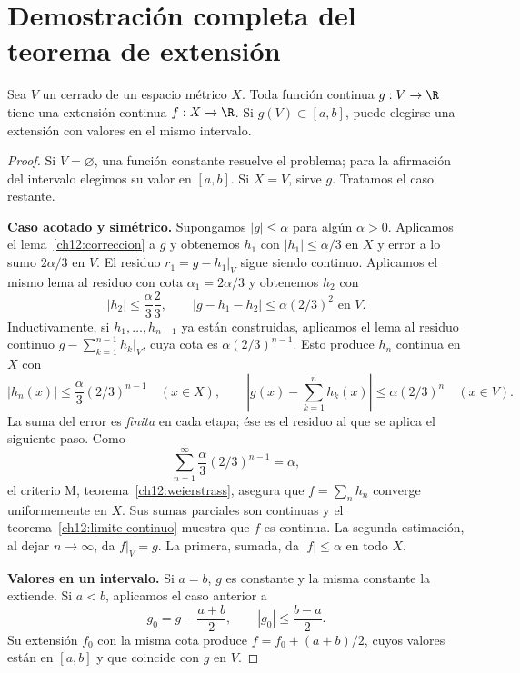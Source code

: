 \section{Demostración completa del teorema de extensión}
\begin{teorema}[Tietze]\label{ch12:tietze}
Sea $V$ un cerrado de un espacio métrico $X$. Toda función continua $g:V\to\R$ tiene una extensión continua $f:X\to\R$. Si $g(V)\subset[a,b]$, puede elegirse una extensión con valores en el mismo intervalo.
\end{teorema}
\begin{proof}
Si $V=\varnothing$, una función constante resuelve el problema; para la afirmación del intervalo elegimos su valor en $[a,b]$. Si $X=V$, sirve $g$. Tratamos el caso restante.

\textbf{Caso acotado y simétrico.} Supongamos $|g|\leq\alpha$ para algún $\alpha>0$. Aplicamos el lema~\ref{ch12:correccion} a $g$ y obtenemos $h_1$ con $|h_1|\leq\alpha/3$ en $X$ y error a lo sumo $2\alpha/3$ en $V$. El residuo $r_1=g-h_1|_V$ sigue siendo continuo. Aplicamos el mismo lema al residuo con cota $\alpha_1=2\alpha/3$ y obtenemos $h_2$ con
\[
 |h_2|\leq\frac\alpha3\frac23,
 \qquad |g-h_1-h_2|\leq\alpha(2/3)^2\text{ en }V.
\]
Inductivamente, si $h_1,\ldots,h_{n-1}$ ya están construidas, aplicamos el lema al residuo continuo $g-\sum_{k=1}^{n-1}h_k|_V$, cuya cota es $\alpha(2/3)^{n-1}$. Esto produce $h_n$ continua en $X$ con
\[
 |h_n(x)|\leq\frac\alpha3(2/3)^{n-1}\quad(x\in X),
 \qquad
 \left|g(x)-\sum_{k=1}^nh_k(x)\right|\leq\alpha(2/3)^n\quad(x\in V).
\]
La suma del error es \emph{finita} en cada etapa; ése es el residuo al que se aplica el siguiente paso. Como
\[
 \sum_{n=1}^\infty\frac\alpha3(2/3)^{n-1}=\alpha,
\]
el criterio M, teorema~\ref{ch12:weierstrass}, asegura que $f=\sum_nh_n$ converge uniformemente en $X$. Sus sumas parciales son continuas y el teorema~\ref{ch12:limite-continuo} muestra que $f$ es continua. La segunda estimación, al dejar $n\to\infty$, da $f|_V=g$. La primera, sumada, da $|f|\leq\alpha$ en todo $X$.

\textbf{Valores en un intervalo.} Si $a=b$, $g$ es constante y la misma constante la extiende. Si $a<b$, aplicamos el caso anterior a
\[
 g_0=g-\frac{a+b}{2},\qquad |g_0|\leq\frac{b-a}{2}.
\]
Su extensión $f_0$ con la misma cota produce $f=f_0+(a+b)/2$, cuyos valores están en $[a,b]$ y que coincide con $g$ en $V$.


\end{proof}

